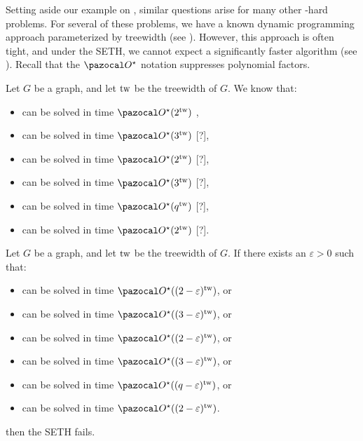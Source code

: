 \medskip

Setting aside our example on , similar questions arise for many other \NP-hard problems. For several of these problems, we have a known dynamic programming approach parameterized by treewidth (see ). However, this approach is often tight, and under the SETH, we cannot expect a significantly faster algorithm (see ). Recall that the $\O^\star$ notation suppresses polynomial factors. 

\begin{theorem}
    \label{theorem:treewidth-algo}
    Let $G$ be a graph, and let $\text{tw}$ be the treewidth of $G$. We know that:
    \begin{itemize}
        \item {} can be solved in time $\O^\star(2^{\tw})$ \cite{bjorklund2007fourier},
        \item {} can be solved in time $\O^\star(3^{\tw})$ [?],
        \item {} can be solved in time $\O^\star(2^{\tw})$ [?],
        \item {} can be solved in time $\O^\star(3^{\tw})$ [?],
        \item {} can be solved in time $\O^\star(q^{\tw})$ [?],
        \item {} can be solved in time $\O^\star(2^{\tw})$ [?].
    \end{itemize}
\end{theorem}

\begin{theorem}
    \label{theorem:treewidth-bound}
    Let $G$ be a graph, and let $\text{tw}$ be the treewidth of $G$. If there exists an $\varepsilon > 0$ such that:
    \begin{itemize}
        \item {} can be solved in time $\O^\star((2-\varepsilon)^{\tw})$, or
        \item {} can be solved in time $\O^\star((3-\varepsilon)^{\tw})$, or
        \item {} can be solved in time $\O^\star((2-\varepsilon)^{\tw})$, or
        \item {} can be solved in time $\O^\star((3-\varepsilon)^{\tw})$, or
        \item {} can be solved in time $\O^\star((q-\varepsilon)^{\tw})$, or
        \item {} can be solved in time $\O^\star((2-\varepsilon)^{\tw})$.
    \end{itemize}
    then the SETH fails.
\end{theorem}


